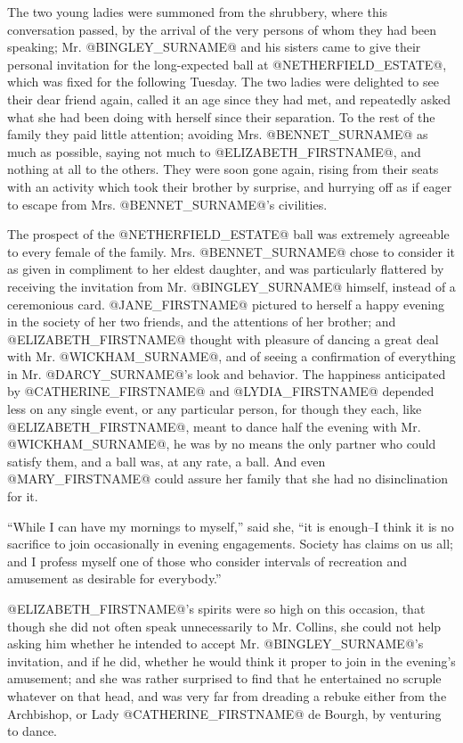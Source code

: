 The two young ladies were summoned from the shrubbery, where this
conversation passed, by the arrival of the very persons of whom they had
been speaking; Mr. @BINGLEY_SURNAME@ and his sisters came to give their personal
invitation for the long-expected ball at @NETHERFIELD_ESTATE@, which was fixed
for the following Tuesday. The two ladies were delighted to see their
dear friend again, called it an age since they had met, and repeatedly
asked what she had been doing with herself since their separation. To
the rest of the family they paid little attention; avoiding Mrs. @BENNET_SURNAME@
as much as possible, saying not much to @ELIZABETH_FIRSTNAME@, and nothing at all to
the others. They were soon gone again, rising from their seats with an
activity which took their brother by surprise, and hurrying off as if
eager to escape from Mrs. @BENNET_SURNAME@'s civilities.

The prospect of the @NETHERFIELD_ESTATE@ ball was extremely agreeable to every
female of the family. Mrs. @BENNET_SURNAME@ chose to consider it as given in
compliment to her eldest daughter, and was particularly flattered
by receiving the invitation from Mr. @BINGLEY_SURNAME@ himself, instead of a
ceremonious card. @JANE_FIRSTNAME@ pictured to herself a happy evening in the
society of her two friends, and the attentions of her brother; and
@ELIZABETH_FIRSTNAME@ thought with pleasure of dancing a great deal with Mr.
@WICKHAM_SURNAME@, and of seeing a confirmation of everything in Mr. @DARCY_SURNAME@'s look
and behavior. The happiness anticipated by @CATHERINE_FIRSTNAME@ and @LYDIA_FIRSTNAME@ depended
less on any single event, or any particular person, for though they
each, like @ELIZABETH_FIRSTNAME@, meant to dance half the evening with Mr. @WICKHAM_SURNAME@,
he was by no means the only partner who could satisfy them, and a ball
was, at any rate, a ball. And even @MARY_FIRSTNAME@ could assure her family that she
had no disinclination for it.

``While I can have my mornings to myself,'' said she, ``it is enough--I
think it is no sacrifice to join occasionally in evening engagements.
Society has claims on us all; and I profess myself one of those
who consider intervals of recreation and amusement as desirable for
everybody.''

@ELIZABETH_FIRSTNAME@'s spirits were so high on this occasion, that though she did
not often speak unnecessarily to Mr. Collins, she could not help asking
him whether he intended to accept Mr. @BINGLEY_SURNAME@'s invitation, and if
he did, whether he would think it proper to join in the evening's
amusement; and she was rather surprised to find that he entertained no
scruple whatever on that head, and was very far from dreading a rebuke
either from the Archbishop, or Lady @CATHERINE_FIRSTNAME@ de Bourgh, by venturing to
dance.

